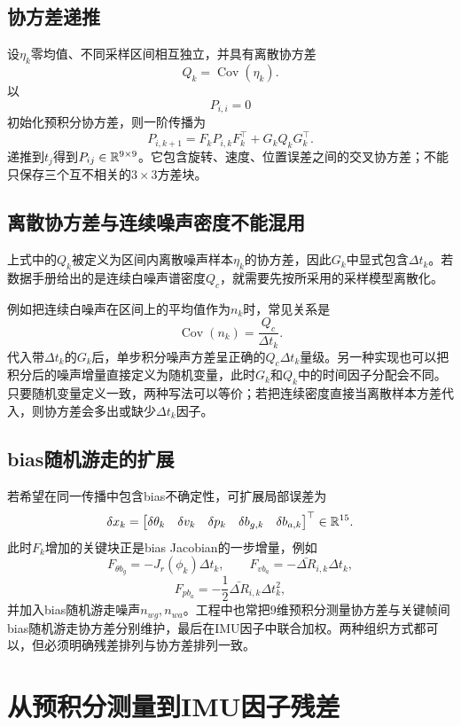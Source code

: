 \subsection{协方差递推}

设$\eta_k$零均值、不同采样区间相互独立，并具有离散协方差
\[
    Q_k=\operatorname{Cov}(\eta_k).
\]
以
\[
    P_{i,i}=0
\]
初始化预积分协方差，则一阶传播为
\[
\boxed{
    P_{i,k+1}
    =F_kP_{i,k}F_k^\top+G_kQ_kG_k^\top.
}
\]
递推到$t_j$得到$P_{ij}\in\mathbb{R}^{9\times9}$。它包含旋转、速度、位置误差之间的交叉协方差；不能只保存三个互不相关的$3\times3$方差块。

\subsection{离散协方差与连续噪声密度不能混用}

上式中的$Q_k$被定义为区间内离散噪声样本$\eta_k$的协方差，因此$G_k$中显式包含$\Delta t_k$。若数据手册给出的是连续白噪声谱密度$Q_c$，就需要先按所采用的采样模型离散化。

例如把连续白噪声在区间上的平均值作为$n_k$时，常见关系是
\[
    \operatorname{Cov}(n_k)=\frac{Q_c}{\Delta t_k}.
\]
代入带$\Delta t_k$的$G_k$后，单步积分噪声方差呈正确的$Q_c\Delta t_k$量级。另一种实现也可以把积分后的噪声增量直接定义为随机变量，此时$G_k$和$Q_k$中的时间因子分配会不同。只要随机变量定义一致，两种写法可以等价；若把连续密度直接当离散样本方差代入，则协方差会多出或缺少$\Delta t_k$因子。

\subsection{bias随机游走的扩展}

若希望在同一传播中包含bias不确定性，可扩展局部误差为
\[
    \delta x_k
    =\begin{bmatrix}
        \delta\theta_k&\delta v_k&\delta p_k&
        \delta b_{g,k}&\delta b_{a,k}
      \end{bmatrix}^\top\in\mathbb{R}^{15}.
\]
此时$F_k$增加的关键块正是bias Jacobian的一步增量，例如
\[
    F_{\theta b_g}=-J_r(\phi_k)\Delta t_k,
    \qquad
    F_{v b_a}=-\bar{\Delta R}_{i,k}\Delta t_k,
\]
\[
    F_{p b_a}=-\frac12\bar{\Delta R}_{i,k}\Delta t_k^2,
\]
并加入bias随机游走噪声$n_{wg},n_{wa}$。工程中也常把$9$维预积分测量协方差与关键帧间bias随机游走协方差分别维护，最后在IMU因子中联合加权。两种组织方式都可以，但必须明确残差排列与协方差排列一致。


\section{从预积分测量到IMU因子残差}

